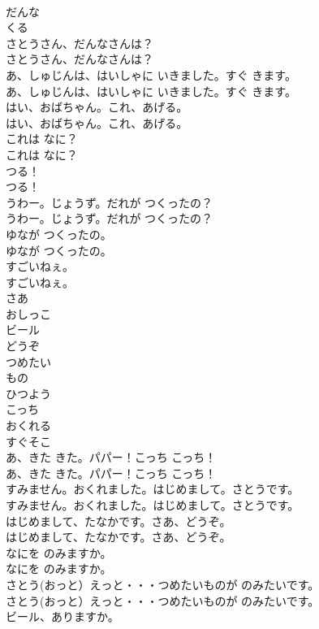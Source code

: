 \documentclass[8pt]{extreport}
\begin{document}
\begin{CJK}{UTF8}{min}
\\	だんな
\\	くる
\\	さとうさん、だんなさんは？
\\	さとうさん、だんなさんは？
\\	あ、しゅじんは、はいしゃに いきました。すぐ きます。
\\	あ、しゅじんは、はいしゃに いきました。すぐ きます。
\\	はい、おばちゃん。これ、あげる。
\\	はい、おばちゃん。これ、あげる。
\\	これは なに？
\\	これは なに？
\\	つる！
\\	つる！
\\	うわー。じょうず。だれが つくったの？
\\	うわー。じょうず。だれが つくったの？
\\	ゆなが つくったの。
\\	ゆなが つくったの。
\\	すごいねぇ。
\\	すごいねぇ。
\\	さあ
\\	おしっこ
\\	ビール
\\	どうぞ
\\	つめたい
\\	もの
\\	ひつよう
\\	こっち
\\	おくれる
\\	すぐそこ
\\	あ、きた きた。パパー！こっち こっち！
\\	あ、きた きた。パパー！こっち こっち！
\\	すみません。おくれました。はじめまして。さとうです。
\\	すみません。おくれました。はじめまして。さとうです。
\\	はじめまして、たなかです。さあ、どうぞ。
\\	はじめまして、たなかです。さあ、どうぞ。
\\	なにを のみますか。
\\	なにを のみますか。
\\	さとう(おっと）えっと・・・つめたいものが のみたいです。
\\	さとう(おっと）えっと・・・つめたいものが のみたいです。
\\	ビール、ありますか。

\end{CJK}
\end{document}

